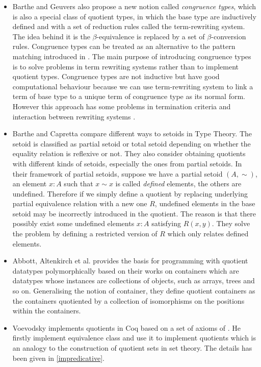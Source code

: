 \begin{itemize}
\item Barthe and Geuvers \cite{bar:96} also propose a new notion called
\emph{congruence types}, which is also a special class of quotient
types, in which the base type are inductively defined and with a set
of reduction rules called the term-rewriting system. The idea behind
it is the $\beta$-equivalence is replaced by a set of
$\beta$-conversion rules. Congruence types can be treated as an
alternative to the pattern matching introduced in \cite{coq:92}. The main
purpose of introducing congruence types is to solve problems in
term rewriting systems rather than to implement quotient types.
Congruence types are not inductive but have good computational behaviour because we can use term-rewriting system to link a term of base type to a unique term of congruence type as its normal form.
However this approach has some problems in termination criteria and interaction between rewriting systems \cite{cou:01}.

\item Barthe and Capretta \cite{bar:03} compare different ways to setoids in Type Theory.
The setoid is classified as partial setoid or total setoid depending
on whether the equality relation is reflexive or not. They also
consider obtaining quotients with different kinds of setoids, especially
the ones from partial setoids.
In their framework of partial setoids, suppose we have a partial setoid $(A,\sim)$,  an element $x : A$ such that $x \sim x$ is called \emph{defined} elements, the others are undefined. Therefore if we simply define a quotient by replacing underlying partial equivalence relation with a new one $R$, undefined elements in the base setoid may be incorrectly introduced in the quotient. The reason is that there possibly exist some undefined elements $x : A$ satisfying $R(x,y)$. They solve the problem by defining a restricted version of $R$ which only relates defined elements.


\item Abbott, Altenkirch et al. \cite{abb:04} provides the basis for
programming with quotient datatypes polymorphically based on their
works on containers which are datatypes whose instances are
collections of objects, such as arrays, trees and so on. Generalising
the notion of container, they define quotient containers as the
containers quotiented by a collection of isomorphisms on the positions
within the containers.

\item Voevodsky \cite{voe:hset} implements quotients in Coq based on a set
of axioms of \hott. He firstly implement
equivalence class and use it to implement quotients which is an
analogy to the construction of quotient sets in set theory. The details has been given in \autoref{impredicative}.
\end{itemize}





